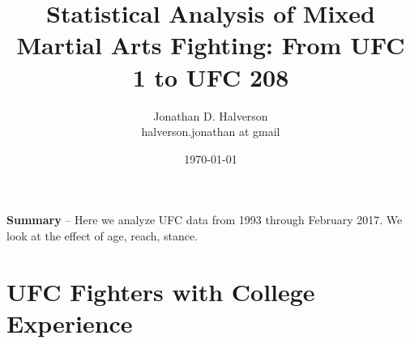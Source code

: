 \documentclass[12pt]{article}
\title{\Huge Statistical Analysis of Mixed Martial Arts Fighting: From UFC 1 to UFC 208}
\date{\Large \today}
\author{\Large Jonathan D. Halverson\\ \tiny halverson.jonathan at gmail}
\begin{document}
\maketitle
\noindent
\textbf{Summary} -- Here we analyze UFC data from 1993 through February 2017. We look at the effect
of age, reach, stance.









\appendix


\section{UFC Fighters with College Experience}
\label{appendix_education}
\begin{center}

\end{center}

%
\end{document}
